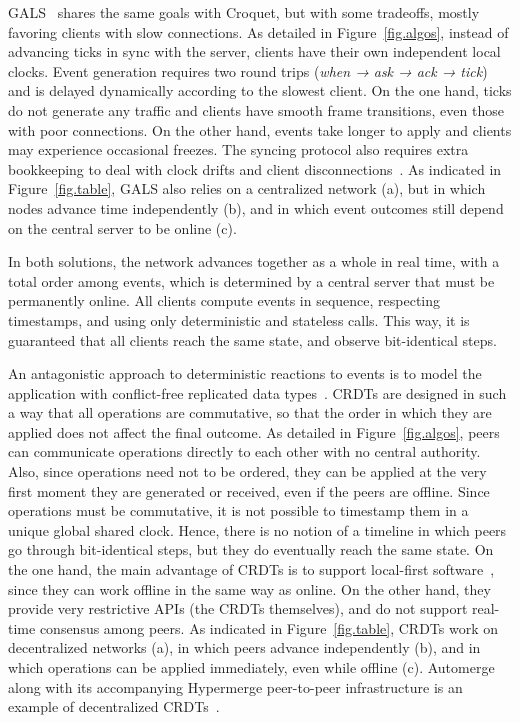 \documentclass[fleqn,10pt]{SelfArx}
\begin{document}
GALS~\cite{gals} shares the same goals with Croquet, but with some tradeoffs,
mostly favoring clients with slow connections.
As detailed in Figure~\ref{fig.algos}, instead of advancing ticks in sync with
the server, clients have their own independent local clocks.
Event generation requires two round trips (\emph{when → ask → ack → tick}) and is
delayed dynamically according to the slowest client.
%
On the one hand, ticks do not generate any traffic and clients have smooth
frame transitions, even those with poor connections.
On the other hand, events take longer to apply and clients may experience
occasional freezes.
The syncing protocol also requires extra bookkeeping to deal with clock drifts
and client disconnections~\cite{gals}.
%
As indicated in Figure~\ref{fig.table}, GALS also relies on a centralized
network (a), but in which nodes advance time independently (b), and in which
event outcomes still depend on the central server to be online (c).

In both solutions, the network advances together as a whole in real time, with
a total order among events, which is determined by a central server that must
be permanently online.
All clients compute events in sequence, respecting timestamps, and using only
deterministic and stateless calls.
This way, it is guaranteed that all clients reach the same state, and
observe bit-identical steps.

An antagonistic approach to deterministic reactions to events is to model the
application with conflict-free replicated data types~\cite{crdts}.
CRDTs are designed in such a way that all operations are commutative, so that
the order in which they are applied does not affect the final outcome.
%
As detailed in Figure~\ref{fig.algos}, peers can communicate operations
directly to each other with no central authority.
Also, since operations need not to be ordered, they can be applied at the
very first moment they are generated or received, even if the peers are
offline.
%
Since operations must be commutative, it is not possible to timestamp them
in a unique global shared clock.
Hence, there is no notion of a timeline in which peers go through
bit-identical steps, but they do eventually reach the same state.
%
On the one hand, the main advantage of CRDTs is to support local-first
software~\cite{local}, since they can work offline in the same way as online.
On the other hand, they provide very restrictive APIs (the CRDTs themselves),
and do not support real-time consensus among peers.
%
As indicated in Figure~\ref{fig.table}, CRDTs work on decentralized networks
(a), in which peers advance independently (b), and in which operations can be
applied immediately, even while offline (c).
%
Automerge along with its accompanying Hypermerge peer-to-peer infrastructure
is an example of decentralized CRDTs~\cite{p2p.automerge,p2p.pushpin}.
\end{document}
